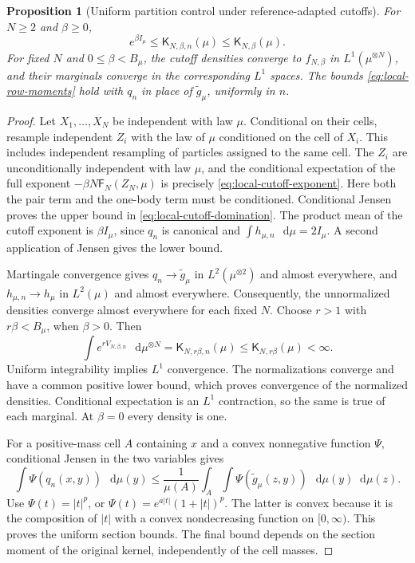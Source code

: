 \documentclass[11pt,reqno]{amsart}
\numberwithin{equation}{section}
\theoremstyle{plain}
\newtheorem{prop}[prop]{Proposition}
\theoremstyle{definition}
\newcommand{\dd}{\mathop{}\!\mathrm d}
\newcommand{\be}{\beta}
\newcommand{\K}{\mathsf K}
\newcommand{\Fr}{\mathsf F}
\newcommand{\tl}{\widetilde}
\begin{document}
\begin{prop}[Uniform partition control under reference-adapted cutoffs]
\label{prop:local-Markov-cutoff}
For $N\geq2$ and $\be\geq0$,
\begin{equation}
 e^{\be I_\mu}\leq\K_{N,\be,n}(\mu)\leq\K_{N,\be}(\mu).
 \label{eq:local-cutoff-domination}
\end{equation}
For fixed $N$ and $0\leq\be<B_\mu$, the cutoff densities converge to $f_{N,\be}$ in $L^1(\mu^{\otimes N})$, and their marginals converge in the corresponding $L^1$ spaces. The bounds \eqref{eq:local-row-moments} hold with $q_n$ in place of $\tl g_\mu$, uniformly in $n$.
\end{prop}
\begin{proof}
Let $X_1,\ldots,X_N$ be independent with law $\mu$. Conditional on their cells, resample independent $Z_i$ with the law of $\mu$ conditioned on the cell of $X_i$. This includes independent resampling of particles assigned to the same cell. The $Z_i$ are unconditionally independent with law $\mu$, and the conditional expectation of the full exponent $-\be N\Fr_N(Z_N,\mu)$ is precisely \eqref{eq:local-cutoff-exponent}. Here both the pair term and the one-body term must be conditioned. Conditional Jensen proves the upper bound in \eqref{eq:local-cutoff-domination}. The product mean of the cutoff exponent is $\be I_\mu$, since $q_n$ is canonical and $\int h_{\mu,n}\,\dd\mu=2I_\mu$. A second application of Jensen gives the lower bound.

Martingale convergence gives $q_n\to\tl g_\mu$ in $L^2(\mu^{\otimes2})$ and almost everywhere, and $h_{\mu,n}\to h_\mu$ in $L^2(\mu)$ and almost everywhere. Consequently, the unnormalized densities converge almost everywhere for each fixed $N$. Choose $r>1$ with $r\be<B_\mu$, when $\be>0$. Then
\begin{equation}
 \int e^{rV_{N,\be,n}}\,\dd\mu^{\otimes N}
 =\K_{N,r\be,n}(\mu)\leq\K_{N,r\be}(\mu)<\infty.
 \label{eq:local-cutoff-uniform-integrability}
\end{equation}
Uniform integrability implies $L^1$ convergence. The normalizations converge and have a common positive lower bound, which proves convergence of the normalized densities. Conditional expectation is an $L^1$ contraction, so the same is true of each marginal. At $\be=0$ every density is one.

For a positive-mass cell $A$ containing $x$ and a convex nonnegative function $\Psi$, conditional Jensen in the two variables gives
\begin{equation}
 \int\Psi(q_n(x,y))\,\dd\mu(y)
 \leq\frac1{\mu(A)}\int_A\int\Psi(\tl g_\mu(z,y))\,\dd\mu(y)\dd\mu(z).
 \label{eq:local-cutoff-row-Jensen}
\end{equation}
Use $\Psi(t)=|t|^p$, or $\Psi(t)=e^{a|t|}(1+|t|)^p$. The latter is convex because it is the composition of $|t|$ with a convex nondecreasing function on $[0,\infty)$. This proves the uniform section bounds. The final bound depends on the section moment of the original kernel, independently of the cell masses.
\end{proof}
\end{document}
